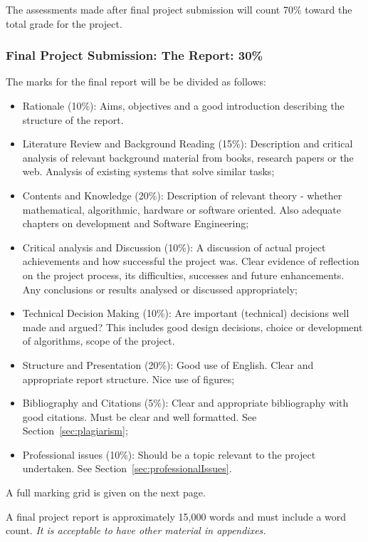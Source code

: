 \documentclass[11pt]{article}
\newcommand{\finalweight}{70\% }
\newcommand{\reportweight}{30\% }
\newcommand{\finalreportlength}{15,000 }
\begin{document}
The assessments made after final project  submission will count \finalweight toward the total grade for the project.


\newpage
\subsubsection{Final Project Submission: The Report: \reportweight}


The marks for the final report will be be divided as follows:
\begin{itemize}
\item Rationale (10\%): Aims, objectives and a good introduction describing the structure of the report.
\item Literature Review and Background Reading (15\%): Description and critical analysis of relevant background material from books, research papers or the web.  Analysis of existing systems that solve similar tasks;
\item Contents and Knowledge (20\%): Description of relevant theory - whether mathematical, algorithmic, hardware or software oriented.  Also adequate chapters on development and Software Engineering;
\item Critical analysis and Discussion (10\%): A discussion of actual project achievements and how successful the project was. Clear evidence of reflection on the project process, its difficulties, successes and future enhancements.  Any conclusions or results analysed or discussed appropriately;
\item Technical Decision Making (10\%): Are important (technical) decisions well made and argued?  This includes good design decisions, choice or development of algorithms, scope of the project.
\item Structure and Presentation (20\%):  Good use of English.  Clear and appropriate report structure.  Nice use of figures;
\item Bibliography and Citations (5\%): Clear and appropriate bibliography with good citations.  Must be clear and well formatted.  See Section~\ref{sec:plagiarism};
\item Professional issues (10\%): Should be a topic relevant to the project undertaken. See Section~\ref{sec:professionalIssues}.
\end{itemize}

A full marking grid is given on  the next page.

A final project report is approximately \finalreportlength words and must include a word count.  \textit{It is acceptable to have other material in appendixes. }
\end{document}
